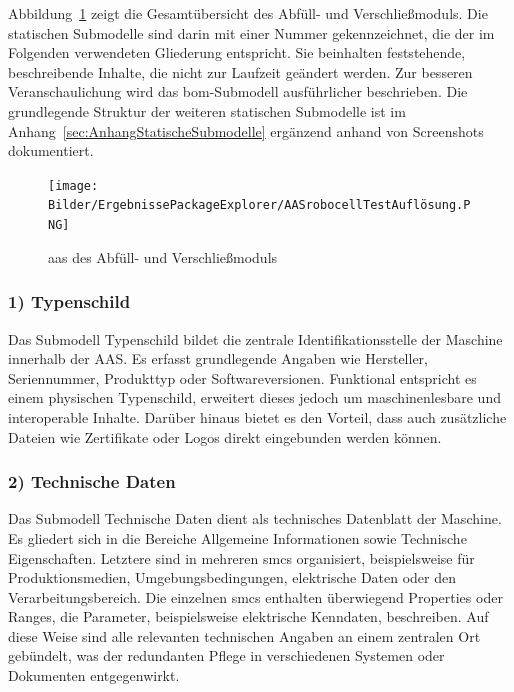 Abbildung~\ref{fig:PackageExplorerRobocell} zeigt die Gesamtübersicht des Abfüll- und Verschließmoduls. 
Die statischen Submodelle sind darin mit einer Nummer gekennzeichnet, die der im Folgenden verwendeten Gliederung entspricht. 
Sie beinhalten feststehende, beschreibende Inhalte, die nicht zur Laufzeit geändert werden. 
Zur besseren Veranschaulichung wird das \acs{bom}-Submodell ausführlicher beschrieben.
Die grundlegende Struktur der weiteren statischen Submodelle ist im Anhang~\ref{sec:AnhangStatischeSubmodelle} ergänzend anhand von Screenshots dokumentiert.

\begin{figure}[htbp]
    \centering
        \texttt{[image: Bilder/ErgebnissePackageExplorer/AASrobocellTestAuflösung.PNG]}
    \caption{\acs{aas} des Abfüll- und Verschließmoduls}
    \label{fig:PackageExplorerRobocell}
\end{figure}

\subsubsection*{1) Typenschild}
\vspace{-0.5em} 
Das Submodell Typenschild bildet die zentrale Identifikationsstelle der Maschine innerhalb der AAS. 
Es erfasst grundlegende Angaben wie Hersteller, Seriennummer, Produkttyp oder Softwareversionen. 
Funktional entspricht es einem physischen Typenschild, erweitert dieses jedoch um maschinenlesbare und interoperable Inhalte. 
Darüber hinaus bietet es den Vorteil, dass auch zusätzliche Dateien wie Zertifikate oder Logos direkt eingebunden werden können.

\subsubsection*{2) Technische Daten}
\vspace{-0.5em}

Das Submodell Technische Daten dient als technisches Datenblatt der Maschine.  
Es gliedert sich in die Bereiche Allgemeine Informationen sowie Technische Eigenschaften. 
Letztere sind in mehreren \acsp{smc} organisiert, beispielsweise für Produktionsmedien, Umgebungsbedingungen, elektrische Daten oder den Verarbeitungsbereich. 
Die einzelnen \acsp{smc} enthalten überwiegend Properties oder Ranges, die Parameter, beispielsweise elektrische Kenndaten, beschreiben.
Auf diese Weise sind alle relevanten technischen Angaben an einem zentralen Ort gebündelt, was der redundanten Pflege in verschiedenen Systemen oder Dokumenten entgegenwirkt. 

